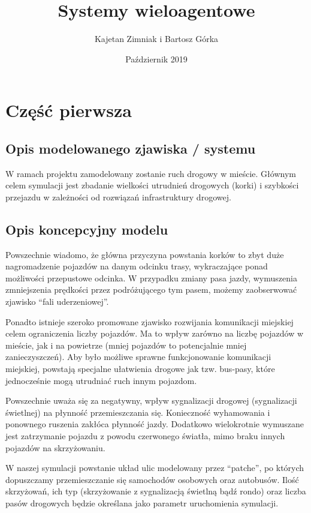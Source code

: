 \documentclass{article}
\title{Systemy wieloagentowe}
\author{Kajetan Zimniak i Bartosz Górka }
\date{Październik 2019}
\begin{document}
\maketitle

\section{Część pierwsza}
\subsection{Opis modelowanego zjawiska / systemu}
\label{subsection:opis-modelu}
W ramach projektu zamodelowany zostanie ruch drogowy w mieście. Głównym celem symulacji jest zbadanie wielkości utrudnień drogowych (korki) i szybkości przejazdu w zależności od rozwiązań infrastruktury drogowej.

\subsection{Opis koncepcyjny modelu}
\label{subsection:opis-koncepcyjny}
Powszechnie wiadomo, że główna przyczyna powstania korków to zbyt duże nagromadzenie pojazdów na danym odcinku trasy, wykraczające ponad możliwości przepustowe odcinka. W przypadku zmiany pasa jazdy, wymuszenia zmniejszenia prędkości przez podróżującego tym pasem, możemy zaobserwować zjawisko ``fali uderzeniowej''.

Ponadto istnieje szeroko promowane zjawisko rozwijania komunikacji miejskiej celem ograniczenia liczby pojazdów. Ma to wpływ zarówno na liczbę pojazdów w mieście, jak i na powietrze (mniej pojazdów to potencjalnie mniej zanieczyszczeń). Aby było możliwe sprawne funkcjonowanie komunikacji miejskiej, powstają specjalne ułatwienia drogowe jak tzw. bus-pasy, które jednocześnie mogą utrudniać ruch innym pojazdom.

Powszechnie uważa się za negatywny, wpływ sygnalizacji drogowej (sygnalizacji świetlnej) na płynność przemieszczania się. Konieczność wyhamowania i ponownego ruszenia zakłóca płynność jazdy. Dodatkowo wielokrotnie wymuszane jest zatrzymanie pojazdu z powodu czerwonego światła, mimo braku innych pojazdów na skrzyżowaniu.

W naszej symulacji powstanie układ ulic modelowany przez ``patche'', po których dopuszczamy przemieszczanie się samochodów osobowych oraz autobusów. Ilość skrzyżowań, ich typ (skrzyżowanie z sygnalizacją świetlną bądź rondo) oraz liczba pasów drogowych będzie określana jako parametr uruchomienia symulacji.
\end{document}
